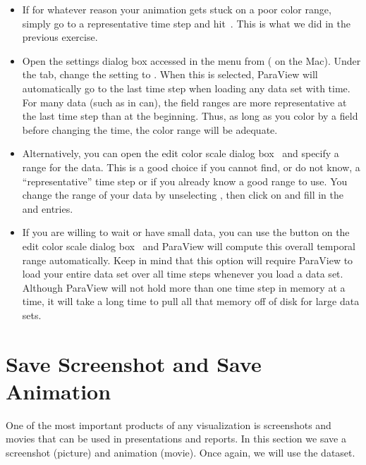 \begin{itemize}
\item If for whatever reason your animation gets stuck on a poor color
  range, simply go to a representative time step and
  hit~.  This is what we did in the previous exercise.
\item Open the settings dialog box accessed in the menu from  \ra
   ( \ra {} on the Mac).  Under
  the  tab, change the  setting to .  When this is selected, ParaView will automatically go
  to the last time step when loading any data set with time.  For many data
  (such as in can), the field ranges are more representative at the last
  time step than at the beginning.  Thus, as long as you color by a field
  before changing the time, the color range will be adequate.
\item Alternatively, you can open the edit color scale dialog
  box~ and specify a range for the data.  This is a
  good choice if you cannot find, or do not know, a ``representative'' time
  step or if you already know a good range to use.  You change the range of your  data by unselecting , 
  then click on  and fill in the  
  and  entries.  
\item {} If you are willing to wait or have small  data, you can
  use the  button on the edit color scale
  dialog box~ and ParaView will compute this overall
  temporal range automatically.  Keep in mind that this option will require
  ParaView to load your entire data set over all time steps whenever you
  load a data set.  Although ParaView will not hold more than one time step
  in memory at a time, it will take a long time to pull all that memory off
  of disk for large data sets.
\end{itemize}


\section{Save Screenshot and Save Animation}

One of the most important products of any visualization is screenshots and 
movies that can be used in presentations and reports.  In this section we 
save a screenshot (picture) and animation (movie). Once again, we
will use the  dataset.

